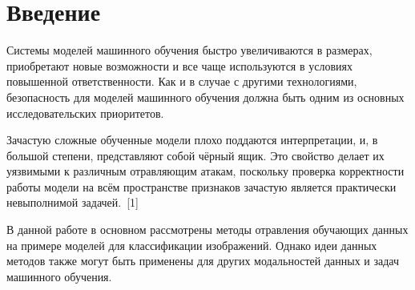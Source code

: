 \section*{Введение}
Системы моделей машинного обучения быстро увеличиваются в размерах, приобретают новые возможности и все чаще используются в условиях повышенной ответственности. Как и в случае с другими технологиями, безопасность для моделей машинного обучения должна быть одним из основных исследовательских приоритетов.

Зачастую сложные обученные модели плохо поддаются интерпретации, и, в большой степени, представляют собой чёрный ящик.
Это свойство делает их уязвимыми к различным отравляющим атакам, поскольку проверка корректности работы модели на всём пространстве признаков зачастую является практически невыполнимой задачей.~[1]

В данной работе в основном рассмотрены методы отравления обучающих данных на примере моделей для классификации изображений. Однако идеи данных методов также могут быть применены для других модальностей данных и задач машинного обучения.


